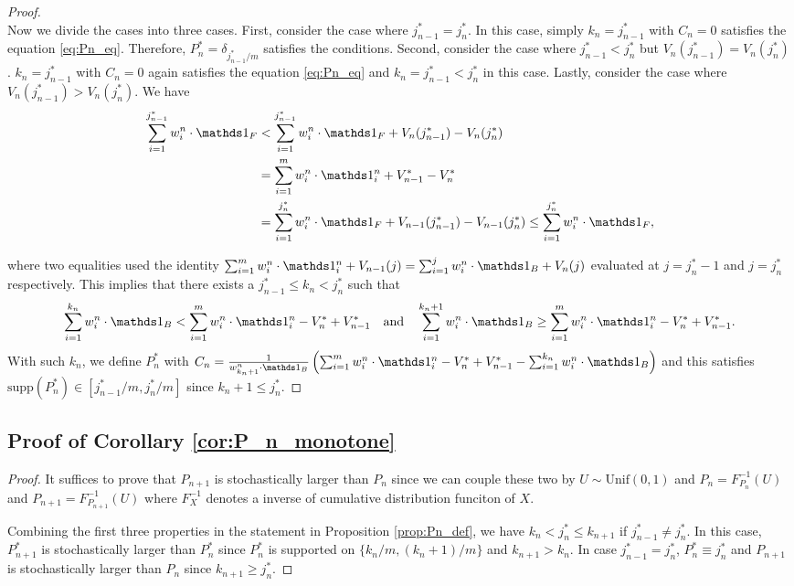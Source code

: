 \begin{proof}
  \smallskip \\
  Now we divide the cases into three cases. 
  First, consider the case where $j_{n-1}^* = j_n^*$. In this case, simply $k_n = j_{n-1}^*$ with $C_n=0$ satisfies the equation \eqref{eq:Pn_eq}. Therefore, $P_n^* = \delta_{j_{n-1}^*/m}$ satisfies the conditions.
  Second, consider the case where $j_{n-1}^* < j_n^*$ but $V_n(j_{n-1}^*) = V_n(j_n^*)$. $k_n = j_{n-1}^*$ with $C_n=0$ again satisfies the equation \eqref{eq:Pn_eq} and $k_n = j_{n-1}^* < j_n^*$ in this case.
  Lastly, consider the case where $V_n(j_{n-1}^*) > V_n(j_n^*)$. We have 
  \begin{align*}
    \sum_{i=1}^{j_{n-1}^*} w_i^n \cdot \one_F
    & < \sum_{i=1}^{j_{n-1}^*} w_i^n \cdot \one_F + V_n(j_{n-1}^*) - V_n(j_n^*) \\
    & = \sum_{i=1}^{m} w_i^n \cdot \one_i^n + V_{n-1}^* - V_n^* \\
    & = \sum_{i=1}^{j_{n}^*} w_i^n \cdot \one_F + V_{n-1}(j_{n-1}^*) - V_{n-1}(j_n^*) 
    \leq \sum_{i=1}^{j_{n}^*} w_i^n \cdot \one_F,
  \end{align*}
  
  where two equalities used the identity $\sum_{i=1}^{m} w_i^n \cdot \one_i^n + V_{n-1}(j) = \sum_{i=1}^{j} w_i^n \cdot \one_B + V_n(j)$ evaluated at $j=j_n^*-1$ and $j=j_n^*$ respectively.
  This implies that there exists a $j_{n-1}^* \leq k_n < j_n^*$ such that 
  \begin{align}\label{eq:Pn_kn_condition}
    \sum_{i=1}^{k_n} w_i^n \cdot \one_B < \sum_{i=1}^{m} w_i^n \cdot \one_i^n - V_n^* + V_{n-1}^* \quad \text{and} \quad \sum_{i=1}^{k_n+1} w_i^n \cdot \one_B \geq \sum_{i=1}^{m} w_i^n \cdot \one_i^n - V_n^* + V_{n-1}^*.
  \end{align}
  With such $k_n$, we define $P_n^*$ with $C_n = \frac{1}{w_{k_n+1}^n \cdot \one_B} \left( \sum_{i=1}^{m} w_i^n \cdot \one_i^n - V_n^* + V_{n-1}^* - \sum_{i=1}^{k_n} w_i^n \cdot \one_B \right)$ and this satisfies $\text{supp}(P_n^*) \in [j_{n-1}^*/m, j_n^*/m]$ since $k_n+1 \leq j_n^*$.
\end{proof}



\subsection{Proof of Corollary \ref{cor:P_n_monotone}} \label{pf:P_n_monotone}
\begin{proof}
  It suffices to prove that $P_{n+1}$ is stochastically larger than $P_n$ since we can couple these two by $U \sim \text{Unif}(0,1)$ and $P_n = F_{P_n}^{-1}(U)$ and $P_{n+1} = F_{P_{n+1}}^{-1}(U)$ where $F_X^{-1}$ denotes a inverse of cumulative distribution funciton of $X$. 
  
  Combining the first three properties in the statement in Proposition \ref{prop:Pn_def}, we have $k_n < j_n^* \leq k_{n+1}$ if $j_{n-1}^* \neq j_n^*$. In this case, $P_{n+1}^*$ is stochastically larger than $P_n^*$ since $P_n^*$ is supported on $\{k_n / m, (k_n+1)/m\}$ and $k_{n+1} > k_n$. In case $j_{n-1}^* = j_n^*$, $P_n^* \equiv j_{n}^*$ and $P_{n+1}$ is stochastically larger than $P_n$ since $k_{n+1} \geq j_n^*$.
\end{proof}


